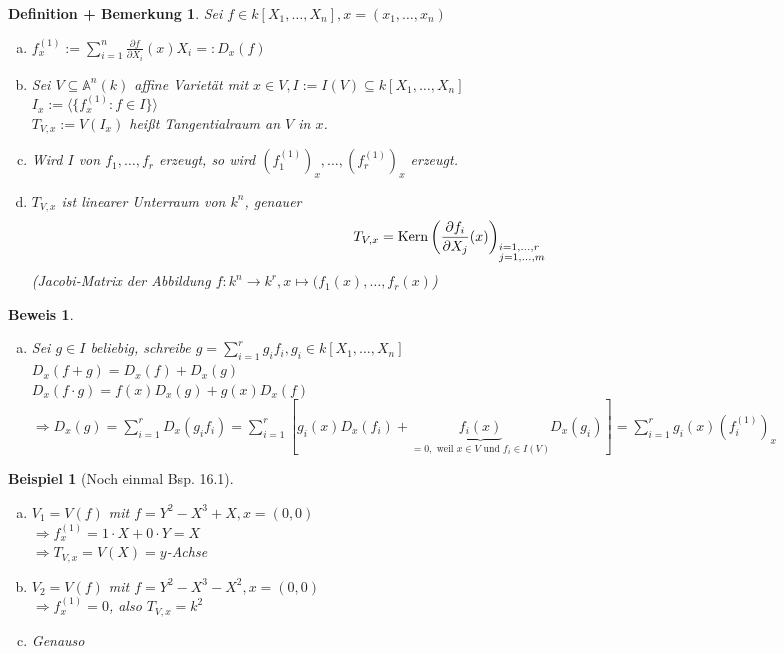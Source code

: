 \documentclass[a4paper,12pt]{report}
\theoremstyle{break}
\newtheorem{DefBem}[Def]{Definition + Bemerkung}
\theoremstyle{nonumberbreak}
\newtheorem{nnBsp}{Beispiel}
\newtheorem{Bew}{Beweis}
\theoremstyle{nonumberplain}
\newcommand{\Sum}{\sum\limits}
\DeclareMathOperator{\Kern}{Kern}
\newcommand{\A}{\mathbb{A}}
\begin{document}
\begin{DefBem}\label{16.3}
Sei $f \in k[X_1,\ldots ,X_n], x=(x_1,\ldots ,x_n)$\begin{enumerate}[a)]
\item
	$f_x^{(1)}:=\Sum_{i=1}^n\frac{\partial f}{\partial X_i}(x)X_i =:D_x(f)$
\item
	Sei $V\subseteq \A^n(k)$ affine Variet\"at mit $x\in V, I:=I(V)\subseteq k[X_1,\ldots ,X_n]$\\
	$I_x:=\langle\{f_x^{(1)}:f\in I\}\rangle$\\
	$T_{V,x}:=V(I_x)$ hei\ss t Tangentialraum an $V$ in $x$.
\item
	Wird $I$ von $f_1,\ldots ,f_r$ erzeugt, so wird $(f_1^{(1)})_x,\ldots ,(f_r^{(1)})_x$ erzeugt.
\item\label{16.3d}
	$T_{V,x}$ ist linearer Unterraum von $k^n$, genauer
		\[ T_{V,x}=\Kern\left( \frac{\partial f_i}{\partial X_j}(x) \right)_{\begin{subarray}{l}i=1,\ldots ,r\\j=1,\ldots ,m\end{subarray}}\]
	(Jacobi-Matrix der Abbildung $f:k^n\to k^r, x\mapsto(f_1(x),\ldots ,f_r(x)$)
\end{enumerate}\end{DefBem}

\begin{Bew}\begin{enumerate}[a)]\item[c)]
Sei $g\in I$ beliebig, schreibe $g=\Sum_{i=1}^r g_if_i, g_i\in k[X_1,\ldots ,X_n]$\\
$D_x(f+g)=D_x(f)+D_x(g)$\\
$D_x(f\cdot g)=f(x)D_x(g)+g(x)D_x(f)$\\
$\Rightarrow D_x(g)=\Sum_{i=1}^rD_x(g_if_i)=\Sum_{i=1}^r[g_i(x)D_x(f_i)+\underbrace{f_i(x)}_{=0, \text{ weil }x\in V \text{ und } f_i\in I(V)}D_x(g_i)] = \Sum_{i=1}^rg_i(x)(f_i^{(1)})_x$
\end{enumerate}\end{Bew}

\begin{nnBsp}[Noch einmal Bsp. 16.1]\begin{enumerate}[a)]
\item
	$V_1=V(f)$ mit $f=Y^2-X^3+X, x=(0,0)$\\
	$\Rightarrow f_x^{(1)}=1\cdot X+0\cdot Y=X$\\
	$\Rightarrow T_{V,x}=V(X)= y$-Achse
\item
	$V_2=V(f)$ mit $f=Y^2-X^3-X^2, x=(0,0)$\\
	$\Rightarrow f_x^{(1)}=0$, also $T_{V,x}=k^2$
\item
	Genauso
\end{enumerate}\end{nnBsp}
\end{document}
